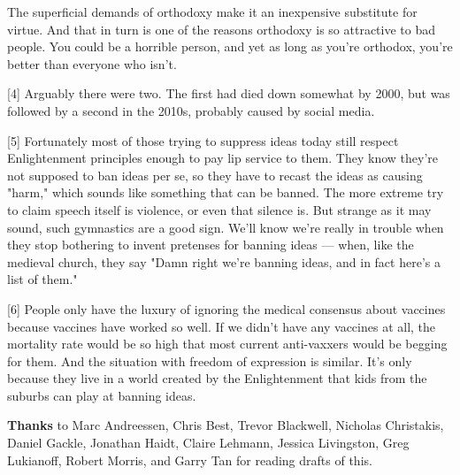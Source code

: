 The superficial
                  demands of orthodoxy make it an inexpensive substitute for
                  virtue. And that in turn is one of the reasons orthodoxy is so
                  attractive to bad people. You could be a horrible person, and
                  yet as long as you're orthodox, you're better than everyone
                  who isn't.

[4] Arguably there were two. The first had died down somewhat
                  by 2000, but was followed by a second in the 2010s, probably
                  caused by social media.

[5] Fortunately most of those trying to suppress ideas today
                  still respect Enlightenment principles enough to pay lip
                  service to them. They know they're not supposed to ban ideas
                  per se, so they have to recast the ideas as causing "harm,"
                  which sounds like something that can be banned. The more
                  extreme try to claim speech itself is violence, or even that
                  silence is. But strange as it may sound, such gymnastics are a
                  good sign. We'll know we're really in trouble when they stop
                  bothering to invent pretenses for banning ideas --- when,
                  like the medieval church, they say "Damn right we're banning
                  ideas, and in fact here's a list of them."

[6] People only have the luxury of ignoring the medical
                  consensus about vaccines because vaccines have worked so well.
                  If we didn't have any vaccines at all, the mortality rate
                  would be so high that most current anti-vaxxers would be
                  begging for them. And the situation with freedom of expression
                  is similar. It's only because they live in a world created by
                  the Enlightenment that kids from the suburbs can play at
                  banning ideas.



\textbf{Thanks} to Marc Andreessen, Chris Best, Trevor
                    Blackwell, Nicholas Christakis, Daniel Gackle, Jonathan
                    Haidt, Claire Lehmann, Jessica Livingston, Greg Lukianoff,
                    Robert Morris, and Garry Tan for reading drafts of
                    this.


              
            
          
            
              
                


                  
              
            
          
